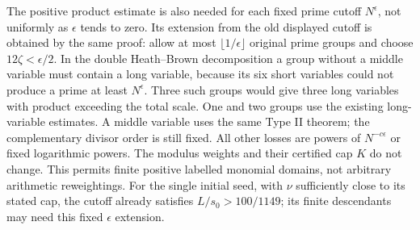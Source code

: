 The positive product estimate is also needed for each fixed prime
cutoff $N^\epsilon$, not uniformly as $\epsilon$ tends to zero.
Its extension from the old displayed cutoff is obtained by the same
proof: allow at most $\lfloor1/\epsilon\rfloor$ original prime groups
and choose $12\zeta<\epsilon/2$.  In the double Heath--Brown
decomposition a group without a middle variable must contain a long
variable, because its six short variables could not produce a prime
at least $N^\epsilon$.  Three such groups would give three long
variables with product exceeding the total scale.  One and two groups
use the existing long-variable estimates.  A middle variable uses
the same Type II theorem; the complementary divisor order is still
fixed.  All other losses are powers of $N^{-c\epsilon}$ or fixed
logarithmic powers.  The modulus weights and their certified cap $K$
do not change.  This permits finite positive labelled monomial domains,
not arbitrary arithmetic reweightings.  For the single initial seed,
with $\nu$ sufficiently close to its stated cap,
the cutoff already satisfies $L/s_0>100/1149$; its finite descendants may need this fixed
$\epsilon$ extension.

